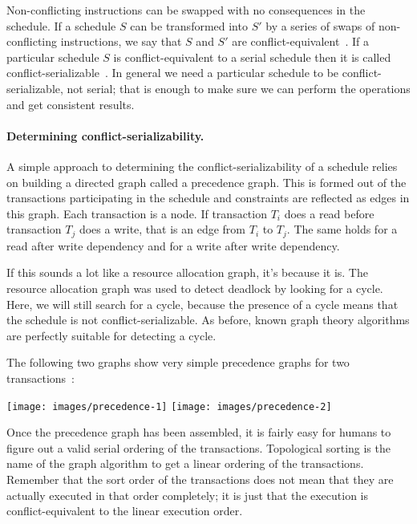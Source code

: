 \documentclass[a4paper]{report}
\begin{document}
Non-conflicting instructions can be swapped with no consequences in the schedule. If a schedule $S$ can be transformed into $S'$ by a series of swaps of non-conflicting instructions, we say that $S$ and $S'$ are conflict-equivalent~\cite{dsc}. If a particular schedule $S$ is conflict-equivalent to a serial schedule then it is called conflict-serializable~\cite{dsc}. In general we need a particular schedule to be conflict-serializable, not serial; that is enough to make sure we can perform the operations and get consistent results.

\paragraph{Determining conflict-serializability.} A simple approach to determining the conflict-serializability of a schedule relies on building a directed graph called a precedence graph. This is formed out of the transactions participating in the schedule and constraints are reflected as edges in this graph. Each transaction is a node. If transaction $T_{i}$ does a read before transaction $T_{j}$ does a write, that is an edge from $T_{i}$ to $T_{j}$. The same holds for a read after write dependency and for a write after write dependency. 

If this sounds a lot like a resource allocation graph, it's because it is. The resource allocation graph was used to detect deadlock by looking for a cycle. Here, we will still search for a cycle, because the presence of a cycle means that the schedule is not conflict-serializable. As before, known graph theory algorithms are perfectly suitable for detecting a cycle.

The following two graphs show very simple precedence graphs for two transactions~\cite{dsc}:

\begin{center}
\texttt{[image: images/precedence-1]}
\texttt{[image: images/precedence-2]}
\end{center}

Once the precedence graph has been assembled, it is fairly easy for humans to figure out a valid serial ordering of the transactions. Topological sorting is the name of the graph algorithm to get a linear ordering of the transactions. Remember that the sort order of the transactions does not mean that they are actually executed in that order completely; it is just that the execution is conflict-equivalent to the linear execution order. 
\end{document}

